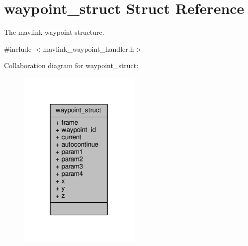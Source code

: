 \hypertarget{structwaypoint__struct}{\section{waypoint\+\_\+struct Struct Reference}
\label{structwaypoint__struct}
}


The mavlink waypoint structure.  




{\ttfamily \#include $<$mavlink\+\_\+waypoint\+\_\+handler.\+h$>$}



Collaboration diagram for waypoint\+\_\+struct\+:
\nopagebreak
\begin{figure}[H]
\begin{center}
\leavevmode
\includegraphics[width=166pt]{structwaypoint__struct__coll__graph}
\end{center}
\end{figure}
